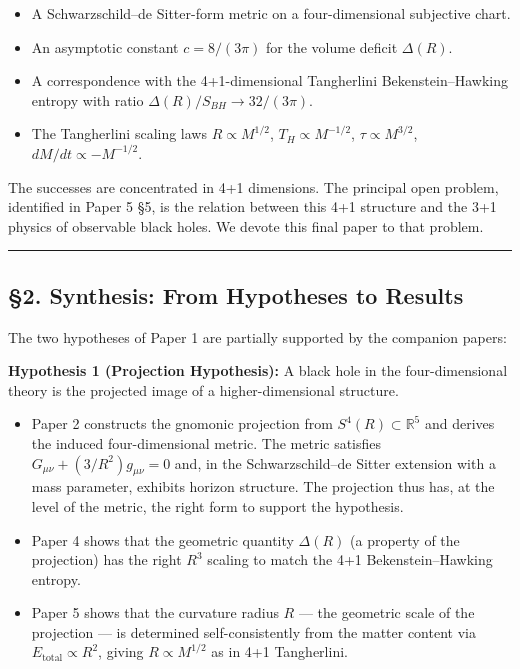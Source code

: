 \documentclass[a4paper,11pt]{article}
\theoremstyle{definition}
\providecommand{\tightlist}{\setlength{\itemsep}{0pt}\setlength{\parskip}{0pt}}
\begin{document}
\begin{itemize}
\tightlist
\item
  A Schwarzschild--de Sitter-form metric on a four-dimensional
  subjective chart.
\item
  An asymptotic constant \(c = 8/(3\pi)\) for the volume deficit
  \(\Delta(R)\).
\item
  A correspondence with the 4+1-dimensional Tangherlini
  Bekenstein--Hawking entropy with ratio
  \(\Delta(R)/S_{BH} \to 32/(3\pi)\).
\item
  The Tangherlini scaling laws \(R \propto M^{1/2}\),
  \(T_H \propto M^{-1/2}\), \(\tau \propto M^{3/2}\),
  \(dM/dt \propto -M^{-1/2}\).
\end{itemize}

The successes are concentrated in 4+1 dimensions. The principal open
problem, identified in Paper 5 §5, is the relation between this 4+1
structure and the 3+1 physics of observable black holes. We devote this
final paper to that problem.

\begin{center}\rule{0.5\linewidth}{0.5pt}\end{center}

\subsection{§2. Synthesis: From Hypotheses to
Results}\label{synthesis-from-hypotheses-to-results}

The two hypotheses of Paper 1 are partially supported by the companion
papers:

\textbf{Hypothesis 1 (Projection Hypothesis):} A black hole in the
four-dimensional theory is the projected image of a higher-dimensional
structure.

\begin{itemize}
\tightlist
\item
  Paper 2 constructs the gnomonic projection from
  \(S^4(R) \subset \mathbb{R}^5\) and derives the induced
  four-dimensional metric. The metric satisfies
  \(G_{\mu\nu} + (3/R^2) g_{\mu\nu} = 0\) and, in the Schwarzschild--de
  Sitter extension with a mass parameter, exhibits horizon structure.
  The projection thus has, at the level of the metric, the right form to
  support the hypothesis.
\item
  Paper 4 shows that the geometric quantity \(\Delta(R)\) (a property of
  the projection) has the right \(R^3\) scaling to match the 4+1
  Bekenstein--Hawking entropy.
\item
  Paper 5 shows that the curvature radius \(R\) --- the geometric scale
  of the projection --- is determined self-consistently from the matter
  content via \(E_{\mathrm{total}} \propto R^2\), giving
  \(R \propto M^{1/2}\) as in 4+1 Tangherlini.
\end{itemize}
\end{document}
